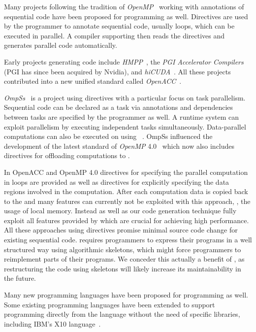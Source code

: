 \bigskip

Many projects following the tradition of \emph{OpenMP}~\cite{OpenMP} working with annotations of sequential code have been proposed for \GPU programming as well.
Directives are used by the programmer to annotate sequential code, usually loops, which can be executed in parallel.
A compiler supporting then reads the directives and generates parallel code automatically.

Early projects generating \GPU code include \emph{HMPP}~\cite{DolbeauBiBo2007}, the \emph{PGI Accelerator Compilers} (PGI has since been acquired by Nvidia), and \emph{hiCUDA}~\cite{HanA11}.
All these projects contributed into a new unified standard called \emph{OpenACC}~\cite{OpenACC}.

\emph{OmpSs}~\cite{ElangovanBP12,DuranABLMMP11} is a project using directives with a particular focus on task parallelism.
Sequential code can be declared as a task via annotations and dependencies between tasks are specified by the programmer as well.
A runtime system can exploit parallelism by executing independent tasks simultaneously.
Data-parallel computations can also be executed on \GPUs using \OpenCL~\cite{ElangovanBP12}.
OmpSs influenced the development of the latest standard of \emph{OpenMP} 4.0~\cite{OpenMP} which now also includes directives for offloading computations to \GPUs.

In OpenACC and OpenMP 4.0 directives for specifying the parallel computation in loops are provided as well as directives for explicitly specifying the data regions involved in the computation.
After each computation data is copied back to the \CPU and many \GPU features can currently not be exploited with this approach, \eg, the usage of local memory.
Instead \SkelCL as well as our code generation technique fully exploit all features provided by \GPUs which are crucial for achieving high performance.
All these approaches using directives promise minimal source code change for existing sequential code.
\SkelCL requires programmers to express their programs in a well structured way using algorithmic skeletons, which might force programmers to reimplement parts of their programs.
We conceder this actually a benefit of \SkelCL, as restructuring the code using skeletons will likely increase its maintainability in the future.

\bigskip

Many new programming languages have been proposed for \GPU programming as well.
Some existing programming languages have been extended to support \GPU programming directly from the language without the need of specific libraries, including IBM's X10 language~\cite{TakeuchiMaKaHoSuSuOn2011}.

